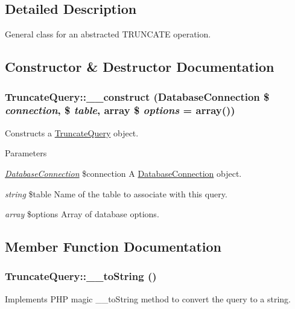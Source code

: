 \subsection{Detailed Description}
General class for an abstracted TRUNCATE operation. 

\subsection{Constructor \& Destructor Documentation}
\hypertarget{classTruncateQuery_a10def81f62ada99bfb5d9f8124e8002b}{
\subsubsection[{\_\-\_\-construct}]{\setlength{\rightskip}{0pt plus 5cm}TruncateQuery::\_\-\_\-construct ({\bf DatabaseConnection} \$ {\em connection}, \/  \$ {\em table}, \/  array \$ {\em options} = {\ttfamily array()})}}
\label{classTruncateQuery_a10def81f62ada99bfb5d9f8124e8002b}
Constructs a \hyperlink{classTruncateQuery}{TruncateQuery} object.


\begin{DoxyParams}{Parameters}
\item[{\em \hyperlink{classDatabaseConnection}{DatabaseConnection}}]\$connection A \hyperlink{classDatabaseConnection}{DatabaseConnection} object. \item[{\em string}]\$table Name of the table to associate with this query. \item[{\em array}]\$options Array of database options. \end{DoxyParams}


\subsection{Member Function Documentation}
\hypertarget{classTruncateQuery_a4a18f66831b99b10cccd74c617fa6723}{
\subsubsection[{\_\-\_\-toString}]{\setlength{\rightskip}{0pt plus 5cm}TruncateQuery::\_\-\_\-toString ()}}
\label{classTruncateQuery_a4a18f66831b99b10cccd74c617fa6723}
Implements PHP magic \_\-\_\-toString method to convert the query to a string.

